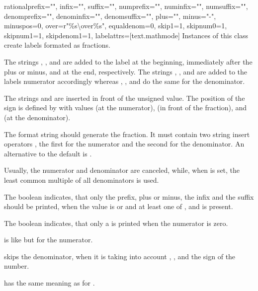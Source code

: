 \begin{classdesc}{rational}{prefix="", infix="", suffix="",
                            numprefix="", numinfix="", numsuffix="",
                            denomprefix="", denominfix="", denomsuffix="",
                            plus="", minus="-", minuspos=0, over=r"{{\%s}\textbackslash over{\%s}}",
                            equaldenom=0, skip1=1, skipnum0=1, skipnum1=1, skipdenom1=1,
                            labelattrs=[text.mathmode]}
  Instances of this class create labels formated as fractions.

  The strings , , and  are added to
  the label at the beginning, immediately after the plus or minus, and at
  the end, respectively. The strings ,
  , and  are added to the labels
  numerator accordingly whereas , ,
  and  do the same for the denominator.

  The strings  and  are inserted in front of the
  unsigned value. The position of the sign is defined by
   with values  (at the numerator), 
  (in front of the fraction), and  (at the denominator).

  The format string  should generate the fraction. It
  must contain two string insert operators , the first for
  the numerator and the second for the denominator. An alternative to
  the default is .

  Usually, the numerator and denominator are canceled, while, when
   is set, the least common multiple of all
  denominators is used.

  The boolean  indicates, that only the prefix, plus or minus,
  the infix and the suffix should be printed, when the value is
   or  and at least one of , 
  and  is present.

  The boolean  indicates, that only a  is
  printed when the numerator is zero.

   is like  but for the numerator.

   skips the denominator, when it is  taking
  into account , , 
   and the sign of the number.

   has the same meaning as for .
\end{classdesc} %

